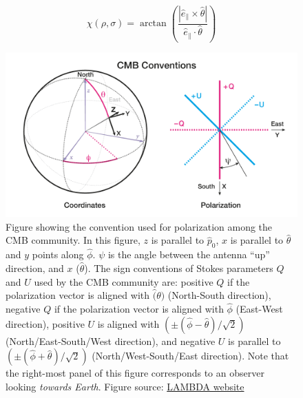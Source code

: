 \documentclass[a4paper,fleqn]{cas-dc}\sloppy
\newcommand{\co}{\mathbin{\|}}
\begin{document}
	\begin{equation}
	\chi(\rho,\sigma) = \arctan \left( \frac{ |\hat{e}_{\co} \times \hat{\theta}| }{ \hat{e}_{\co} \cdot \hat{\theta} } \right)
	\label{eq::chi}
	\end{equation}
	
	\begin{figure}
		\centering
		\includegraphics[width=1\linewidth]{figures/cmb_coord_convention}
		\caption{Figure showing the convention used for polarization among the CMB community. In this figure, $z$ is parallel to $\hat{p}_0$, $x$ is parallel to $\hat{\theta}$ and $y$ points along $\hat{\phi}$. $\psi$ is the angle between the antenna ``up'' direction, and $x$ ($\hat{\theta}$). The sign conventions of Stokes parameters $Q$ and $U$ used by the CMB community are: positive $Q$ if the polarization vector is aligned with $\hat(\theta)$ (North-South direction), negative $Q$ if the polarization vector is aligned with $\hat{\phi}$ (East-West direction), positive $U$ is aligned with $(\pm(\hat{\phi} - \hat{\theta})/\sqrt{2} )$ (North/East-South/West direction), and negative $U$ is parallel to $(\pm(\hat{\phi} + \hat{\theta})/\sqrt{2} )$ (North/West-South/East direction). Note that the right-most panel of this figure corresponds to an observer looking \textsl{towards Earth}. Figure source: \href{https://lambda.gsfc.nasa.gov/product/about/pol_convention.cfm}{LAMBDA website}}
		\label{fig::cmbcoordconvention}
	\end{figure}
\end{document}
